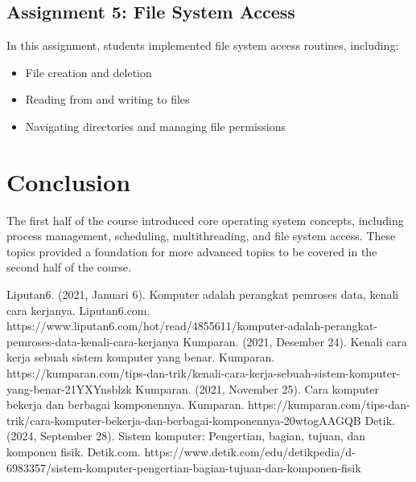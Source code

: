 \documentclass[12pt]{article}
\begin{document}
\subsection{Assignment 5: File System Access}
In this assignment, students implemented file system access routines, including:
\begin{itemize}
    \item File creation and deletion
    \item Reading from and writing to files
    \item Navigating directories and managing file permissions
\end{itemize}

\section{Conclusion}
The first half of the course introduced core operating system concepts, including process management, scheduling, multithreading, and file system access. These topics provided a foundation for more advanced topics to be covered in the second half of the course.


\begin{thebibliography}
     Liputan6. (2021, Januari 6). Komputer adalah perangkat pemroses data, kenali cara kerjanya. Liputan6.com. https://www.liputan6.com/hot/read/4855611/komputer-adalah-perangkat-pemroses-data-kenali-cara-kerjanya
     Kumparan. (2021, Desember 24). Kenali cara kerja sebuah sistem komputer yang benar. Kumparan. https://kumparan.com/tips-dan-trik/kenali-cara-kerja-sebuah-sistem-komputer-yang-benar-21YXYnsblzk
     Kumparan. (2021, November 25). Cara komputer bekerja dan berbagai komponennya. Kumparan. https://kumparan.com/tips-dan-trik/cara-komputer-bekerja-dan-berbagai-komponennya-20wtogAAGQB
     Detik. (2024, September 28). Sistem komputer: Pengertian, bagian, tujuan, dan komponen fisik. Detik.com. https://www.detik.com/edu/detikpedia/d-6983357/sistem-komputer-pengertian-bagian-tujuan-dan-komponen-fisik
\end{thebibliography}
\end{document}

